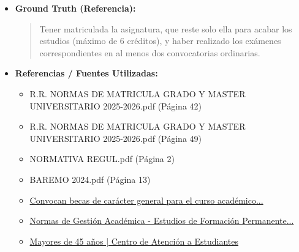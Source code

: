 \documentclass[12pt,a4paper,oneside]{report}
\begin{document}
\begin{itemize}
\begin{itemize}
\begin{quote}
\textbf{Fuentes}:

\begin{itemize}
  \item Universidad de Sevilla. (2025). Normas de Gestión Académica - Estudios Propios de Especialización de Posgrado.
  \item Universidad de Sevilla. (2025). Convocan becas de carácter general para el curso académico 2026-27.
  \item Universidad de Sevilla. (2025). Reglamento general de estudiantes.
  \item Universidad de Sevilla. (2025). Reglamento general de actividades docentes.
\end{itemize}
                \end{quote}
          \item \textbf{{Ground Truth (Referencia):}} \\
                \begin{quote}
Tener matriculada la asignatura, que reste solo ella para acabar los estudios (máximo de 6 créditos), y haber realizado los exámenes correspondientes en al menos dos convocatorias ordinarias.
                \end{quote}
          \item \textbf{{Referencias / Fuentes Utilizadas:}} \\
                \begin{itemize}
                  \item R.R. NORMAS DE MATRICULA GRADO Y MASTER UNIVERSITARIO 2025-2026.pdf (Página 42)
                  \item R.R. NORMAS DE MATRICULA GRADO Y MASTER UNIVERSITARIO 2025-2026.pdf (Página 49)
                  \item NORMATIVA REGUL.pdf (Página 2)
                  \item BAREMO 2024.pdf (Página 13)
                  \item \href{https://www.us.es/sites/default/files/becas-y-ayudas/ayudas-al-estudio/externas/Convocatoria+General+2026-27\_270326.pdf}{Convocan becas de carácter general para el curso académico...}
                  \item \href{https://cfp.us.es/profesores/normas-de-gestion/academicas/estudios-de-formacion-permanente-especializada}{Normas de Gestión Académica - Estudios de Formación Permanente...}
                  \item \href{https://cat.us.es/acceso-y-admision/pruebas-de-acceso/mayores-de-45-anos}{Mayores de 45 años | Centro de Atención a Estudiantes}
                \end{itemize}
        \end{itemize}


\end{itemize}
\end{document}
